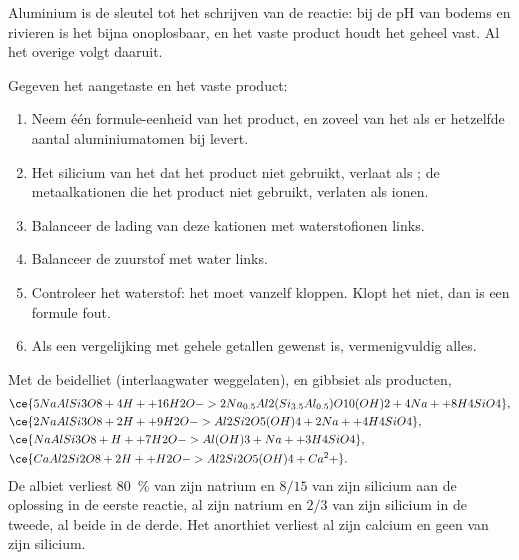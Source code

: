 Aluminium is de sleutel tot het schrijven van de reactie: bij de pH van bodems en rivieren is het bijna onoplosbaar, en het vaste product houdt het geheel vast. Al het overige volgt daaruit.

\begin{method}\label{met:b1:weathering-clays:balance}
Gegeven het aangetaste  en het vaste product:
\begin{enumerate}
  \item Neem één formule-eenheid van het product, en zoveel van het  als er hetzelfde aantal aluminiumatomen bij levert.
  \item Het silicium van het  dat het product niet gebruikt, verlaat als ; de metaalkationen die het product niet gebruikt, verlaten als ionen.
  \item Balanceer de lading van deze kationen met waterstofionen links.
  \item Balanceer de zuurstof met water links.
  \item Controleer het waterstof: het moet vanzelf kloppen. Klopt het niet, dan is een formule fout.
  \item Als een vergelijking met gehele getallen gewenst is, vermenigvuldig alles.
\end{enumerate}
\end{method}

\begin{proposition}\label{prop:b1:weathering-clays:feldspars}
Met de  beidelliet 
(interlaagwater weggelaten),   en gibbsiet
 als producten,
\begin{align*}
&\ce{5 NaAlSi3O8 + 4 H+ + 16 H2O -> 2 Na_{0.5}Al2(Si_{3.5}Al_{0.5})O10(OH)2 + 4 Na+ + 8 H4SiO4},\\ %
&\ce{2 NaAlSi3O8 + 2 H+ + 9 H2O -> Al2Si2O5(OH)4 + 2 Na+ + 4 H4SiO4},\\
&\ce{NaAlSi3O8 + H+ + 7 H2O -> Al(OH)3 + Na+ + 3 H4SiO4},\\
&\ce{CaAl2Si2O8 + 2 H+ + H2O -> Al2Si2O5(OH)4 + Ca^2+}.
\end{align*}
De albiet verliest \qty{80}{\percent} van zijn natrium en $8/15$ van zijn silicium aan de oplossing in de eerste reactie, al zijn natrium en $2/3$ van zijn silicium in de tweede, al beide in de derde. Het anorthiet verliest al zijn calcium en geen van zijn silicium.
\end{proposition}

